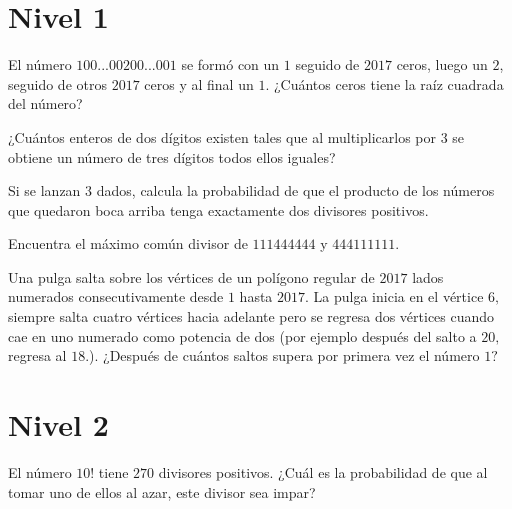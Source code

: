 \section{Nivel 1}

\begin{problem}[OMMEB 2017]
    El número \(100...00200...001\) se formó con un \(1\) 
    seguido de \(2017\) ceros, luego un \(2\), seguido de otros 
    \(2017\) ceros y al final un \(1\). ¿Cuántos ceros tiene 
    la raíz cuadrada del número?
\end{problem}

\begin{problem}[OMMEB 2017]
    ¿Cuántos enteros de dos dígitos existen tales que al 
    multiplicarlos por \(3\) se obtiene un número de tres 
    dígitos todos ellos iguales?
\end{problem}

\begin{problem}[OMMEB 2017]
    Si se lanzan \(3\) dados, calcula la probabilidad de que el 
    producto de los números que quedaron boca arriba tenga 
    exactamente dos divisores positivos.
\end{problem}

\begin{problem}[OMMEB 2017]
    Encuentra el máximo común divisor de \(111444444\) y 
    \(444111111\).
\end{problem}

\begin{problem}[OMMEB 2017]
    Una pulga salta sobre los vértices de un polígono regular 
    de \(2017\) lados numerados consecutivamente desde \(1\) 
    hasta \(2017\). La pulga inicia en el vértice \(6,\) siempre 
    salta cuatro vértices hacia adelante pero se regresa dos 
    vértices cuando cae en uno numerado como potencia de dos 
    (por ejemplo después del salto a \(20,\) regresa al \(18.\)). 
    ¿Después de cuántos saltos supera por primera vez el número 
    \(1?\)
\end{problem}

\section{Nivel 2}

\begin{problem}[OMMEB 2017]
    El número \(10!\) tiene \(270\) divisores positivos. 
    ¿Cuál es la probabilidad de que al tomar uno de ellos al 
    azar, este divisor sea impar?
\end{problem}


